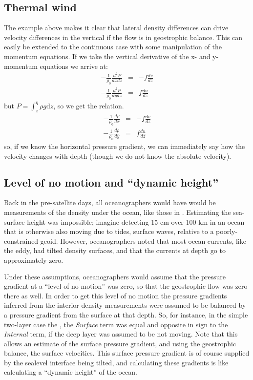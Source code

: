 \subsection{Thermal wind}

The example above makes it clear that lateral density differences can drive velocity differences in the vertical if the flow is in geostrophic balance.  This can easily be extended to the continuous case with some  manipulation of the momentum equations.  If we take the vertical derivative of the x- and y-momentum equations we arrive at:
\begin{eqnarray}
    -\frac{1}{\rho_0}\frac{d^2 P}{dx dz} & = & -f \frac{dv}{dz} \\
    -\frac{1}{\rho_0}\frac{d^2 P}{dy dz} & = & f \frac{du}{dz} 
\end{eqnarray}
but $P = \int_z^{\eta}\rho g \mathrm{d}z$,  so we get the  relation.
\begin{eqnarray}
    -\frac{1}{\rho_0}\frac{d \rho}{dx} & = & -f \frac{dv}{dz} \\
    -\frac{1}{\rho_0}\frac{d \rho}{dy} & = & f \frac{du}{dz} 
\end{eqnarray}
so, if we know the horizontal pressure gradient, we can immediately say how the velocity changes with depth (though we do not know the absolute velocity).  

\subsection{Level of no motion and ``dynamic height''}

Back in the pre-satellite days, all oceanographers would have would be measurements of the density under the ocean, like those in .  Estimating the sea-surface height was impossible; imagine detecting 15 cm over 100 km in an ocean that is otherwise also moving due to tides, surface waves, relative to a poorly-constrained geoid.  However, oceanographers noted that most ocean currents, like the eddy, had tilted density surfaces, and that the currents at depth go to approximately zero.  

Under these assumptions, oceanographers would assume that the pressure gradient at a ``level of no motion'' was zero, so that the geostrophic flow was zero there as well. In order to get this level of no motion the  pressure  gradients inferred from the interior density measurements were assumed to be balanced by a pressure gradient from the surface at that depth.  So, for instance, in the simple two-layer case the , the \emph{Surface} term was equal and opposite in sign to the \emph{Internal} term, if the deep layer was assumed to be not moving.  Note that this allows an estimate of the surface pressure gradient, and using the geostrophic balance, the surface velocities.  This surface pressure gradient is of course supplied by the sealevel interface being tilted, and  calculating these gradients is like calculating a ``dynamic height'' of the ocean.  

